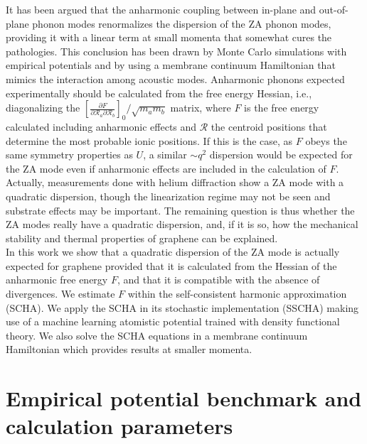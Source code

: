It has been argued\cite{wang2016anharmonic,los2009scaling,katsnelson2013graphene,zakharchenko2009finite,mariani2008flexural,amorim2014thermodynamics,de2012bending} that the anharmonic coupling between in-plane and out-of-plane phonon 
modes renormalizes the dispersion of the ZA phonon modes, providing it with a linear term at small momenta that 
somewhat cures the pathologies. This conclusion has been drawn by Monte Carlo simulations with empirical 
potentials\cite{wang2016anharmonic,los2009scaling,katsnelson2013graphene,zakharchenko2009finite} and by using a 
membrane continuum  Hamiltonian that mimics the interaction among acoustic 
modes\cite{mariani2008flexural,amorim2014thermodynamics,de2012bending}. Anharmonic phonons expected experimentally 
should be calculated from the free energy Hessian, i.e., diagonalizing the  $[\frac{\partial F}{\partial \mathcal{R}_a \partial \mathcal{R}_b}]_{0}/\sqrt{m_am_b}$ matrix, where $F$ is the free energy calculated including anharmonic 
effects and $\boldsymbol{\mathcal{R}}$ the centroid positions that determine the most probable ionic 
positions\cite{bianco2017second}. If this is the case, as $F$ obeys the same symmetry properties as $U$, a similar 
$\sim q^2$ dispersion would be expected for the ZA mode even if anharmonic effects are included in the calculation 
of $F$. Actually, measurements done with helium diffraction show a ZA mode with a quadratic 
dispersion\cite{al2016acoustic,al2015helium,al2018resolving}, though the linearization regime may not be seen and 
substrate effects may be important. The remaining question is thus whether the ZA modes really have a quadratic 
dispersion, and, if it is so, how the mechanical stability and thermal properties of graphene can be explained. \\

In this work we show that a quadratic dispersion of the ZA mode is actually expected for graphene provided that it 
is calculated from the Hessian of the anharmonic free energy $F$, and that it is compatible with the absence of 
divergences. We estimate $F$ within the self-consistent harmonic approximation (SCHA). We apply the SCHA in its 
stochastic implementation (SSCHA) making use of a machine learning atomistic potential trained with density 
functional theory\cite{rowe2018development}. We also solve the SCHA equations in a membrane continuum Hamiltonian 
which provides results at smaller momenta.

\section{Empirical potential benchmark and calculation parameters}

